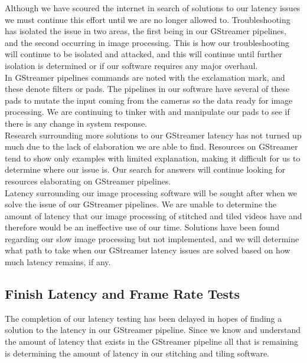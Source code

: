 \documentclass[letterpaper,10pt,serif,draftclsnofoot,onecolumn,compsoc,titlepage]{IEEEtran}
\begin{document}
Although we have scoured the internet in search of solutions to our latency issues we must 
continue this effort until we are no longer allowed to. Troubleshooting has isolated the 
issue in two areas, the first being in our GStreamer pipelines, and the second occurring 
in image processing. This is how our troubleshooting will continue to be isolated and 
attacked, and this will continue until further isolation is determined or if our 
software requires any major overhaul. \\

In GStreamer pipelines commands are noted with the exclamation mark, and these denote 
filters or pads. The pipelines in our software have several of these pads to mutate 
the input coming from the cameras so the data ready for image processing. We are 
continuing to tinker with and manipulate our pads to see if there is any change in 
system response. \\

Research surrounding more solutions to our GStreamer latency has not turned up much 
due to the lack of elaboration we are able to find. Resources on GStreamer tend to show 
only examples with limited explanation, making it difficult for us to determine where 
our issue is. Our search for answers will continue looking for resources elaborating on 
GStreamer pipelines. \\

Latency surrounding our image processing software will be sought after when we solve the 
issue of our GStreamer pipelines. We are unable to determine the amount of latency that 
our image processing of stitched and tiled videos have and therefore would be an 
ineffective 
use of our time. Solutions have been found regarding our slow image processing but not 
implemented, and we will determine what path to take when our GStreamer latency issues 
are solved based on how much latency remains, if any. \\

\subsection{Finish Latency and Frame Rate Tests}

The completion of our latency testing has been delayed in hopes of finding a solution to 
the latency in our GStreamer pipeline. Since we know and understand the amount of latency 
that exists in the GStreamer pipeline all that is remaining is determining the amount of 
latency in our stitching and tiling software. \\
\end{document}
